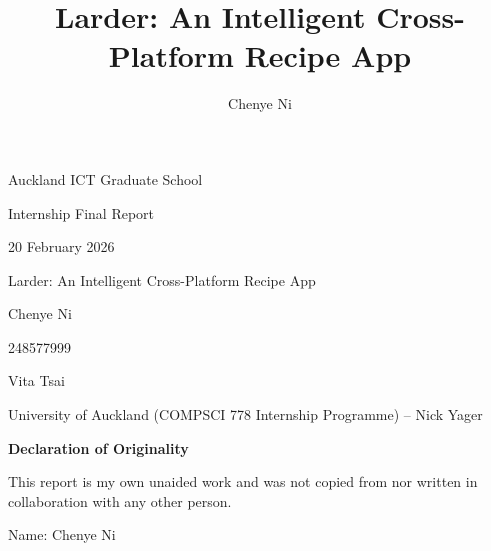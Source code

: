 \documentclass[journal]{IEEEtran}
\begin{document}
\setcounter{page}{1}

\begin{titlepage}
\thispagestyle{empty}
\vspace*{\fill}
\begin{center}
\setlength{\parindent}{0pt}
\setlength{\parskip}{0.9\baselineskip}
{\Large Auckland ICT Graduate School\par}
{\Large Internship Final Report\par}
{\Large 20 February 2026\par}
{\Large Larder: An Intelligent Cross-Platform Recipe App\par}
{\Large Chenye Ni\par}
{\Large 248577999\par}
{\Large Vita Tsai\par}
{\Large University of Auckland (COMPSCI 778 Internship Programme) -- Nick Yager\par}
\end{center}
\vspace*{\fill}
\end{titlepage}

\begin{titlepage}
\thispagestyle{empty}
\raggedright
\vspace*{3cm}
{\LARGE\bfseries Declaration of Originality\par}
\vspace{1.5cm}
{\Large This report is my own unaided work and was not copied from nor written in collaboration with any other person.\par}
\vspace{2cm}

{\Large Name: Chenye Ni\par}
\end{titlepage}

\clearpage
{}
\setcounter{page}{1}

\title{Larder: An Intelligent Cross-Platform Recipe App}
\author{Chenye Ni}

\maketitle
\end{document}
